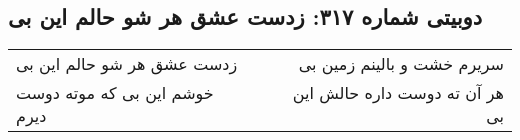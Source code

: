 \begin{center}
\section*{دوبیتی شماره ۳۱۷: زدست عشق هر شو حالم این بی}
\label{sec:317}
\begin{longtable}{l p{0.5cm} r}
زدست عشق هر شو حالم این بی
&&
سریرم خشت و بالینم زمین بی
\\
خوشم این بی که موته دوست دیرم
&&
هر آن ته دوست داره حالش این بی
\\
\end{longtable}
\end{center}
